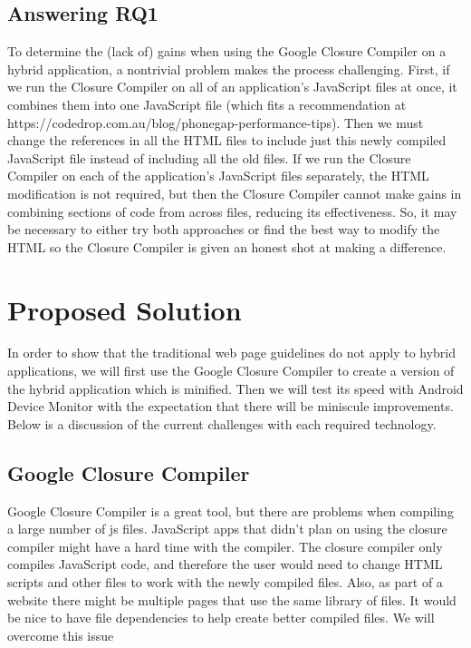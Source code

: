 \documentclass{acm_proc_article-sp}
\begin{document}
\subsection{Answering RQ1}
To determine the (lack of) gains when using the Google Closure Compiler on a hybrid application, a nontrivial problem makes the process challenging.
First, if we run the Closure Compiler on all of an application's JavaScript files at once, it combines them into one JavaScript file (which fits a recommendation at https://codedrop.com.au/blog/phonegap-performance-tips). 
Then we must change the references in all the HTML files to include just this newly compiled JavaScript file instead of including all the old files.
If we run the Closure Compiler on each of the application's JavaScript files separately, the HTML modification is not required, but then the Closure Compiler cannot make gains in combining sections of code from across files, reducing its effectiveness. 
So, it may be necessary to either try both approaches or find the best way to modify the HTML so the Closure Compiler is given an honest shot at making a difference.

\section{Proposed Solution}
In order to show that the traditional web page guidelines do not apply to hybrid applications, we will first use the Google Closure Compiler to create a version of the hybrid application which is minified.
Then we will test its speed with Android Device Monitor with the expectation that there will be miniscule improvements.
Below is a discussion of the current challenges with each required technology.


\subsection{Google Closure Compiler}
Google Closure Compiler is a great tool, but there are problems when compiling a large number of js files. 
JavaScript apps that didn’t plan on using the closure compiler might have a hard time with the compiler. 
The closure compiler only compiles JavaScript code, and therefore the user would need to change HTML scripts and other files to work with the newly compiled files. 
Also, as part of a website there might be multiple pages that use the same library of files. 
It would be nice to have file dependencies to help create better compiled files. 
We will overcome this issue 
\end{document}
